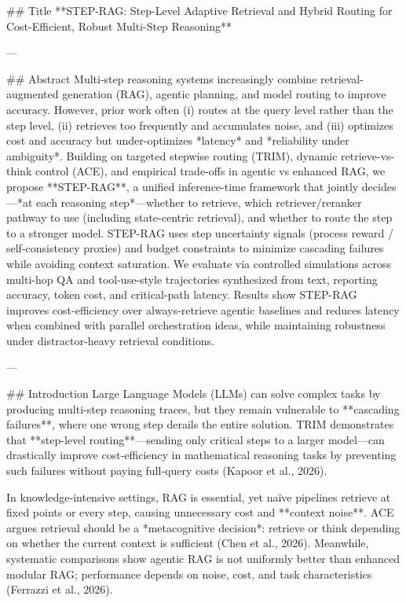 ## Title  
**STEP-RAG: Step-Level Adaptive Retrieval and Hybrid Routing for Cost-Efficient, Robust Multi-Step Reasoning**

---

## Abstract  
Multi-step reasoning systems increasingly combine retrieval-augmented generation (RAG), agentic planning, and model routing to improve accuracy. However, prior work often (i) routes at the query level rather than the step level, (ii) retrieves too frequently and accumulates noise, and (iii) optimizes cost and accuracy but under-optimizes *latency* and *reliability under ambiguity*. Building on targeted stepwise routing (TRIM), dynamic retrieve-vs-think control (ACE), and empirical trade-offs in agentic vs enhanced RAG, we propose **STEP-RAG**, a unified inference-time framework that jointly decides—*at each reasoning step*—whether to retrieve, which retriever/reranker pathway to use (including state-centric retrieval), and whether to route the step to a stronger model. STEP-RAG uses step uncertainty signals (process reward / self-consistency proxies) and budget constraints to minimize cascading failures while avoiding context saturation. We evaluate via controlled simulations across multi-hop QA and tool-use-style trajectories synthesized from text, reporting accuracy, token cost, and critical-path latency. Results show STEP-RAG improves cost-efficiency over always-retrieve agentic baselines and reduces latency when combined with parallel orchestration ideas, while maintaining robustness under distractor-heavy retrieval conditions.

---

## Introduction  
Large Language Models (LLMs) can solve complex tasks by producing multi-step reasoning traces, but they remain vulnerable to **cascading failures**, where one wrong step derails the entire solution. TRIM demonstrates that **step-level routing**—sending only critical steps to a larger model—can drastically improve cost-efficiency in mathematical reasoning tasks by preventing such failures without paying full-query costs (Kapoor et al., 2026).  

In knowledge-intensive settings, RAG is essential, yet naïve pipelines retrieve at fixed points or every step, causing unnecessary cost and **context noise**. ACE argues retrieval should be a *metacognitive decision*: retrieve or think depending on whether the current context is sufficient (Chen et al., 2026). Meanwhile, systematic comparisons show agentic RAG is not uniformly better than enhanced modular RAG; performance depends on noise, cost, and task characteristics (Ferrazzi et al., 2026).  

